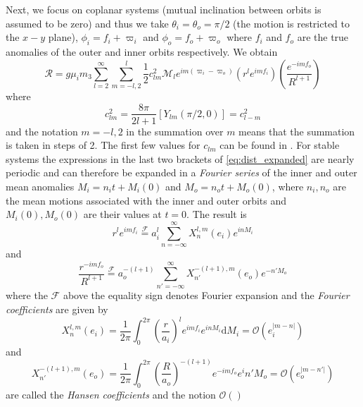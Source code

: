 Next, we focus on coplanar systems
(mutual inclination between orbits is assumed to be zero) and thus we take
$\theta_i=\theta_o=\pi/2$ (the motion is restricted to the $x-y$ plane), 
$\phi_i=f_i+\varpi_i$ and $\phi_o=f_o+\varpi_o$ where $f_i$ and $f_o$ are
the true anomalies of the outer and inner orbits respectively. We obtain 
\begin{equation}
    \mathcal{R}=g\mu_im_3\sum^\infty_{l=2}\sum^l_{m=-l,2} \frac{1}{2} c_{lm}^2\mathcal{M}_l
    e^{im(\varpi_i-\varpi_o)}\left(r^le^{imf_i}\right)\left( \frac{e^{-imf_o}}{R^{l+1}} 
    \right)
    \label{eq:dist_expanded}
\end{equation}
where
\begin{equation}
    c^2_{lm}= \frac{8\pi}{2l+1} \left[Y_{lm}(\pi/2,0)\right]=c^2_{l-m}
\end{equation}
and the notation $m=-l, 2$ in the summation over $m$ means that the summation is taken
in steps of 2. The first few values for $c_{lm}$ can be found in \cite{Mardling2013}.
For stable systems the expressions in the last two brackets of
\cref{eq:dist_expanded} are nearly periodic and can therefore be expanded in a 
\emph{Fourier series} of the inner and outer mean anomalies $M_i=n_it+M_i(0)$ and
$M_o=n_ot+M_o(0)$, where $n_i,n_o$ are the mean motions associated with the inner
and outer orbits and $M_i(0),M_o(0)$ are their values at $t=0$.  The result is
\begin{equation}
    r^le^{imf_i}\stackrel{\mathcal{F}}{=}a_i^l\sum^\infty_{n=-\infty}X^{l,m}_n(e_i)e^{inM_i}
    \label{eq:expansion_1}
\end{equation}
and
\begin{equation}
    \frac{r^{-imf_o}}{R^{l+1}} \stackrel{\mathcal{F}}{=}a_o^{-(l+1)}\sum^\infty_{n'=-\infty}
    X^{-(l+1),m}_{n'}(e_o)e^{-n'M_o}
    \label{eq:expansion_2}
\end{equation}
where the $\mathcal{F}$ above the equality sign denotes Fourier expansion 
and the \emph{Fourier coefficients} are given by
\begin{equation}
    X^{l,m}_n(e_i)= \frac{1}{2\pi} \int^{2\pi}_0 \left(\frac{r}{a_i}\right)^l
    e^{imf_i}e^{inM_i}\mathrm{d}M_i=\mathcal{O}(e_i^{\lvert m-n\rvert})
\end{equation}
and
\begin{equation}
    X^{-(l+1),m}_{n'}(e_o)= \frac{1}{2\pi} \int^{2\pi}_0 \left( \frac{R}{a_o}
    \right)^{-(l+1)}e^{-imf_o}e^in'M_o=\mathcal{O}(e_o^{\lvert m-n'\rvert})
\end{equation}
are called the \emph{Hansen coefficients} and the notion $\mathcal{O}()$
